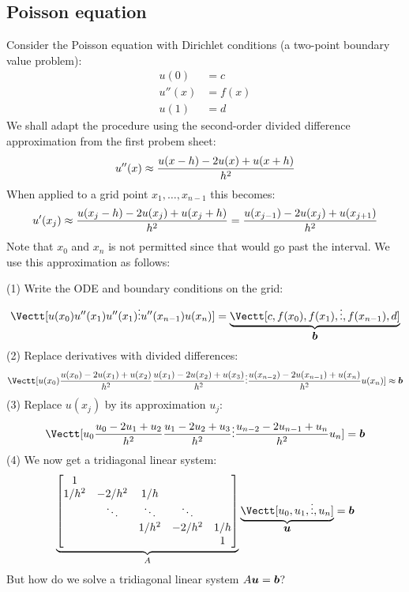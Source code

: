 \subsection{Poisson equation}
Consider the Poisson equation with Dirichlet conditions (a two-point boundary value problem):
\begin{align*}
u(0) &= c \\
u''(x) &= f(x) \\
u(1) &= d
\end{align*}
We shall adapt the procedure using the second-order divided difference approximation from the first probem sheet:
\[
u''(x) \ensuremath{\approx} {u(x-h) - 2u(x) + u(x+h)\over h^2}
\]
When applied to a grid point $x_1,\ensuremath{\ldots},x_{n-1}$ this becomes:
\[
u'(x_j) \ensuremath{\approx} {u(x_j-h) - 2u(x_j) + u(x_j+h)\over h^2} = {u(x_{j-1}) - 2u(x_j) + u(x_{j+1})\over h^2}
\]
Note that $x_0$ and $x_n$ is not permitted since that would go past the interval. We use this approximation as follows:

(1) Write the ODE and boundary conditions on the grid:
\[
\Vectt[u(x_0) \\ 
u''(x_1) \\
u''(x_1) \\
\ensuremath{\vdots} \\
u''(x_{n-1}) \\
u(x_n)] = \underbrace{\Vectt[c, f(x_0), f(x_1), \ensuremath{\vdots} , f(x_{n-1}), d]}_{\ensuremath{\bm{\b}}}
\]
(2) Replace derivatives with divided differences:
\[
\Vectt[u(x_0) \\ 
{u(x_0) - 2u(x_1) + u(x_2)\over h^2} \\
{u(x_1) - 2u(x_2) + u(x_3)\over h^2} \\
\ensuremath{\vdots} \\
{u(x_{n-2}) - 2u(x_{n-1}) + u(x_n)\over h^2} \\
u(x_n)] \ensuremath{\approx} \ensuremath{\bm{\b}}
\]
(3) Replace $u(x_j)$  by its approximation $u_j$:
\[
\Vectt[u_0 \\ 
{u_0 - 2u_1 + u_2\over h^2} \\
{u_1 - 2u_2 + u_3\over h^2} \\
\ensuremath{\vdots} \\
{u_{n-2} - 2u_{n-1} + u_n\over h^2} \\
u_n] = \ensuremath{\bm{\b}}
\]
(4) We now get a tridiagonal linear system:
\[
\underbrace{\begin{bmatrix}
    1 \\ 
    1/h^2 & -2/h^2 & 1/h \\
    & \ensuremath{\ddots} & \ensuremath{\ddots} & \ensuremath{\ddots} \\
   && 1/h^2 & -2/h^2 & 1/h \\ 
   &&&& 1 \end{bmatrix}}_A \underbrace{\Vectt[u_0,u_1,\ensuremath{\vdots},u_n]}_{\ensuremath{\bm{\u}}} = \ensuremath{\bm{\b}}
\]
But how do we solve a tridiagonal linear system $A \bm{{\mbox{\boldmath$u$\unboldmath}}} = \bm{{\mbox{\boldmath$b$\unboldmath}}}$?



